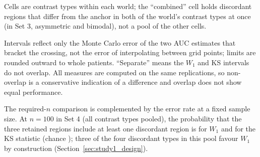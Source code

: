 \documentclass[AMA,Times1COL]{WileyNJDv5}
\begin{document}
\begin{table}[ht]
\centering
\caption{Per-region sample size at which selection AUC reaches 0.9, by cell and measure, interpolated on $\log n$ over the grid $n = 25$--2{,}000, with 95\% Monte Carlo intervals from the delta method applied to the log-$n$ interpolation, using the Monte Carlo standard errors of the two AUC estimates that bracket the crossing. Cells whose AUC stays at chance (--) across the full grid are marked ``blind''; $\leq 25$ marks a target reached at the smallest grid size, where no interval is available, and such a cell counts as separated when 25 lies below the other measure's lower limit.\label{tab:study2_required_n_mc}}
\begin{tablenotes}
\item Cells are contrast types within each world; the ``combined'' cell holds discordant regions that differ from the anchor in both of the world's contrast types at once (in Set 3, asymmetric and bimodal), not a pool of the other cells.
\item Intervals reflect only the Monte Carlo error of the two AUC estimates that bracket the crossing, not the error of interpolating between grid points; limits are rounded outward to whole patients. ``Separate'' means the $W_1$ and KS intervals do not overlap. All measures are computed on the same replications, so non-overlap is a conservative indication of a difference and overlap does not show equal performance.
\end{tablenotes}
\end{table}

The required-$n$ comparison is complemented by the error rate at a fixed sample size. At $n = 100$ in Set 4 (all contrast types pooled), the probability that the three retained regions include at least one discordant region is  for $W_1$ and  for the KS statistic (chance ); three of the four discordant types in this pool favour $W_1$ by construction (Section~\ref{sec:study1_design}).
\end{document}
